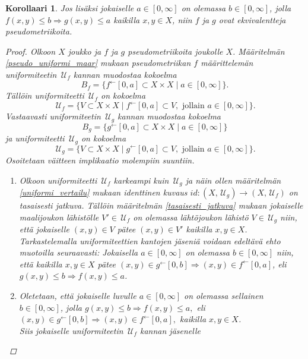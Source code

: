 \documentclass[12pt,a4paper,leqno]{report}
\newcommand{\U}{\,\mathcal{U}}
\theoremstyle{plain}
\newtheorem{kor}[equation]{Korollaari}
\theoremstyle{definition}
\theoremstyle{remark}
\begin{document}
\begin{kor}
Jos lisäksi jokaiselle $a\in[0,\infty]$ on olemassa $b\in[0,\infty]$, jolla $f(x,y)\leq b \Rightarrow g(x,y)\leq a$ kaikilla $x,y\in X$, niin $f$ ja $g$ ovat ekvivalentteja pseudometriikoita.
\begin{proof}
Olkoon $X$ joukko ja $f$ ja $g$ pseudometriikoita joukolle $X$. 
Määritelmän \ref{pseudo_uniformi_maar} mukaan pseudometriikan $f$ määrittelemän uniformiteetin $\U_f$ kannan muodostaa kokoelma 
$$B_f=\{ f^{\leftarrow}[0,a]\subset X\times X\mid a\in[0,\infty]\}.$$ 
Tällöin uniformiteetti $ \U_f$ on kokoelma 
$$\U_f=\{ V\subset X\times X\mid f^{\leftarrow}[0,a]\subset V, \text{ jollain } a\in[0,\infty]\}.$$
Vastaavasti uniformiteetin $\U_g$ kannan muodostaa kokoelma $$B_g=\{ g^{\leftarrow}[0,a]\subset X\times X\mid a\in[0,\infty]\}$$ ja uniformiteetti $ \U_g$ on kokoelma 
$$\U_g=\{ V\subset X\times X\mid g^{\leftarrow}[0,a]\subset V, \text{ jollain } a\in[0,\infty]\}.$$ 
Osoitetaan väitteen implikaatio molempiin suuntiin.
\begin{enumerate}
\item[$\Rightarrow$] 
Olkoon uniformiteetti $\U_f$ karkeampi kuin $\U_g$ ja näin ollen määritelmän \ref{uniformi_vertailu} mukaan identtinen kuvaus $id\colon(X,\U_g)\rightarrow(X,\U_f)$ on tasaisesti jatkuva. 
Tällöin määritelmän \ref{tasaisesti_jatkuva} 
mukaan jokaiselle maalijoukon %
lähistölle $V'\in\U_f $ on olemassa %
lähtöjoukon lähistö $V\in\U_g $ niin, että 
jokaiselle $(x,y)\in V$ pätee $(x,y)\in V'$ kaikilla $x,y\in X$. 
Tarkas\-tele\-mal\-la uniformiteettien kantojen jäseniä 
voidaan edeltävä ehto muotoilla seuraavasti: 
Jokaisella $a\in[0,\infty]$ on olemassa $b\in[0,\infty]$ niin, 
että kaikilla $x,y\in X$ pätee 
$(x,y)\in g^{\leftarrow}[0,b]\Rightarrow (x,y)\in f^{\leftarrow}[0,a]$, 
eli $g(x,y)\leq b\Rightarrow f(x,y) \leq a$.
\item[$\Leftarrow$] Oletetaan, että jokaiselle luvulle 
$a\in[0,\infty]$ on olemassa sellainen $b\in[0,\infty]$, jolla 
$g(x,y)\leq b \Rightarrow f(x,y)\leq a,
$ %
eli %
$(x,y)\in g^{\leftarrow}[0,b]\Rightarrow (x,y)\in f^{\leftarrow}[0,a],$ 
kaikilla $x,y\in X$. 
\\
Siis jokaiselle uniformiteetin $\U_f$ kannan jäsenelle 

\end{enumerate}
\end{proof}
\end{kor}
\end{document}
